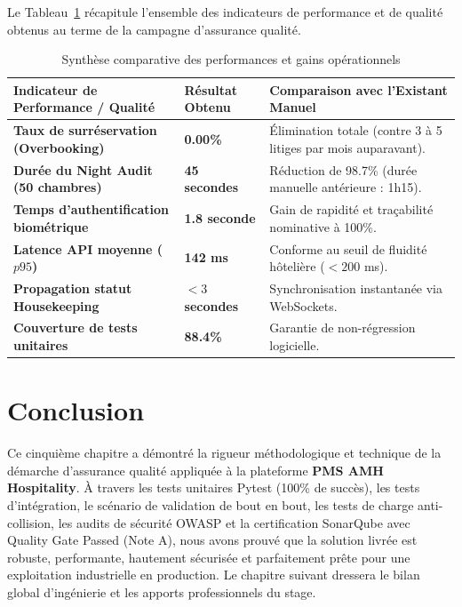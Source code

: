 Le Tableau~\ref{tab:bilan_tests_global} récapitule l'ensemble des indicateurs de performance et de qualité obtenus au terme de la campagne d'assurance qualité.

\begin{table}[H]
\centering
\small
\renewcommand{\arraystretch}{1.3}
\begin{tabularx}{\textwidth}{|p{4.5cm}|p{3.2cm}|X|}
\hline
\textbf{Indicateur de Performance / Qualité} & \textbf{Résultat Obtenu} & \textbf{Comparaison avec l'Existant Manuel} \\
\hline
\textbf{Taux de surréservation (Overbooking)} & \textbf{0.00\%} & Élimination totale (contre 3 à 5 litiges par mois auparavant). \\
\hline
\textbf{Durée du Night Audit (50 chambres)} & \textbf{45 secondes} & Réduction de 98.7\% (durée manuelle antérieure : 1h15). \\
\hline
\textbf{Temps d'authentification biométrique} & \textbf{1.8 seconde} & Gain de rapidité et traçabilité nominative à 100\%. \\
\hline
\textbf{Latence API moyenne ($p95$)} & \textbf{142 ms} & Conforme au seuil de fluidité hôtelière ($< 200$ ms). \\
\hline
\textbf{Propagation statut Housekeeping} & \textbf{$< 3$ secondes} & Synchronisation instantanée via WebSockets. \\
\hline
\textbf{Couverture de tests unitaires} & \textbf{88.4\%} & Garantie de non-régression logicielle. \\
\hline
\end{tabularx}
\caption{Synthèse comparative des performances et gains opérationnels}
\label{tab:bilan_tests_global}
\end{table}

\section{Conclusion}

Ce cinquième chapitre a démontré la rigueur méthodologique et technique de la démarche d'assurance qualité appliquée à la plateforme \textbf{PMS AMH Hospitality}. À travers les tests unitaires Pytest (100\% de succès), les tests d'intégration, le scénario de validation de bout en bout, les tests de charge anti-collision, les audits de sécurité OWASP et la certification SonarQube avec Quality Gate Passed (Note A), nous avons prouvé que la solution livrée est robuste, performante, hautement sécurisée et parfaitement prête pour une exploitation industrielle en production. Le chapitre suivant dressera le bilan global d'ingénierie et les apports professionnels du stage.
